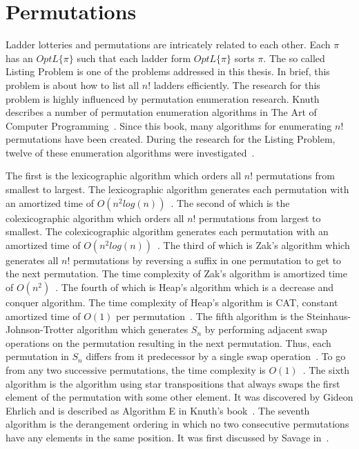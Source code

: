 \section{Permutations}
Ladder lotteries and permutations are intricately related to each other. Each $\pi$ has an $OptL\{\pi\}$ such that 
each ladder form $OptL\{\pi\}$ sorts $\pi$. The so called Listing Problem is one of the problems addressed in this thesis.
In brief, this problem is about how to list all $n!$ ladders efficiently. The research for this problem is highly influenced 
by permutation enumeration research. Knuth describes a number of 
permutation enumeration algorithms in The Art of Computer Programming~\cite{A18}. Since this book, many algorithms for 
enumerating $n!$ permutations have been created. During the research for the Listing Problem, twelve of these 
enumeration algorithms were investigated~\cite{A18,A19,A21,A24,A25,A26,A31,A34,A35,A36,A37}.\par 
The first is the lexicographic algorithm which orders all $n!$ permutations from smallest to largest. The lexicographic 
algorithm generates each permutation with an amortized time of $O(n^{2}log(n))$~\cite{A21}. The second of which is the 
colexicographic algorithm which orders all $n!$ permutations from largest to smallest. The colexicographic 
algorithm generates each permutation with an amortized time of $O(n^{2}log(n))$~\cite{A19}. The third of which is Zak's 
algorithm which generates all $n!$ permutations by reversing a suffix in one permutation to get to the next 
permutation. The time complexity of Zak's algorithm is amortized time of $O(n^{2})$~\cite{A31}.
The fourth of which is Heap's algorithm which is a decrease and conquer algorithm.  
The time complexity of Heap's algorithm is {\sc CAT}, constant amortized time of $O(1)$ per permutation~\cite{A24}.
The fifth algorithm is the Steinhaus-Johnson-Trotter algorithm which generates $S_{n}$ by performing adjacent swap operations 
on the permutation resulting in the next permutation. Thus, each permutation in $S_{n}$ differs 
from it predecessor by a single swap operation~\cite{A25}. To go from any two successive permutations, 
the time complexity is $O(1)$~\cite{A25}.
The sixth algorithm is the algorithm using star transpositions that always swaps the first element of the permutation 
with some other element. It was discovered by Gideon Ehrlich and is described as Algorithm E in Knuth's book~\cite{A18}.
The seventh algorithm is the derangement ordering in which no two consecutive permutations have any elements 
in the same position. It was first discussed by Savage in~\cite{A35}. 
